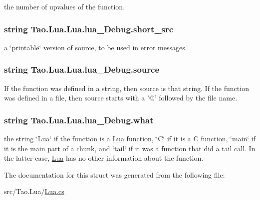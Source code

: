 the number of upvalues of the function. 

\hypertarget{struct_tao_1_1_lua_1_1_lua_1_1lua___debug_acf24961116b22664a053b4144b7d7dd2}{
\subsubsection[{short\_\-src}]{\setlength{\rightskip}{0pt plus 5cm}string {\bf Tao.Lua.Lua.lua\_\-Debug.short\_\-src}}}
\label{struct_tao_1_1_lua_1_1_lua_1_1lua___debug_acf24961116b22664a053b4144b7d7dd2}


a \char`\"{}printable\char`\"{} version of source, to be used in error messages. 

\hypertarget{struct_tao_1_1_lua_1_1_lua_1_1lua___debug_a8682296e8b550c74a40db513c0b39d3c}{
\subsubsection[{source}]{\setlength{\rightskip}{0pt plus 5cm}string {\bf Tao.Lua.Lua.lua\_\-Debug.source}}}
\label{struct_tao_1_1_lua_1_1_lua_1_1lua___debug_a8682296e8b550c74a40db513c0b39d3c}


If the function was defined in a string, then source is that string. If the function was defined in a file, then source starts with a '@' followed by the file name. 

\hypertarget{struct_tao_1_1_lua_1_1_lua_1_1lua___debug_a3b2695a6c96efd00e1b0039e27e8d878}{
\subsubsection[{what}]{\setlength{\rightskip}{0pt plus 5cm}string {\bf Tao.Lua.Lua.lua\_\-Debug.what}}}
\label{struct_tao_1_1_lua_1_1_lua_1_1lua___debug_a3b2695a6c96efd00e1b0039e27e8d878}


the string \char`\"{}Lua\char`\"{} if the function is a \hyperlink{namespace_tao_1_1_lua}{Lua} function, \char`\"{}C\char`\"{} if it is a C function, \char`\"{}main\char`\"{} if it is the main part of a chunk, and \char`\"{}tail\char`\"{} if it was a function that did a tail call. In the latter case, \hyperlink{namespace_tao_1_1_lua}{Lua} has no other information about the function. 



The documentation for this struct was generated from the following file:\begin{DoxyCompactItemize}
\item 
src/Tao.Lua/\hyperlink{_lua_8cs}{Lua.cs}\end{DoxyCompactItemize}
